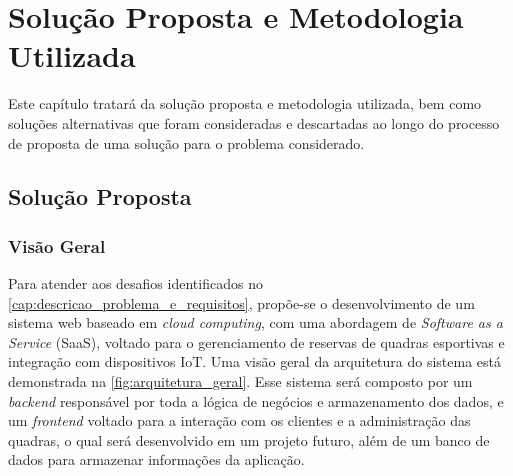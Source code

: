 \chapter{Solução Proposta e Metodologia Utilizada}\label{cap:solucao_proposta}

Este capítulo tratará da solução proposta e metodologia utilizada, bem como soluções alternativas que foram consideradas e descartadas ao longo do processo de proposta de uma solução para o problema considerado.






\section{Solução Proposta}

\subsection{Visão Geral}
Para atender aos desafios identificados no \autoref{cap:descricao_problema_e_requisitos}, propõe-se o desenvolvimento de um sistema web baseado em \textit{cloud computing}, com uma abordagem de \textit{Software as a Service} (SaaS), voltado para o gerenciamento de reservas de quadras esportivas e integração com dispositivos IoT. Uma visão geral da arquitetura do sistema está demonstrada na \autoref{fig:arquitetura_geral}. Esse sistema será composto por um \textit{backend} responsável por toda a lógica de negócios e armazenamento dos dados, e um \textit{frontend} voltado para a interação com os clientes e a administração das quadras, o qual será desenvolvido em um projeto futuro, além de um banco de dados para armazenar informações da aplicação.

